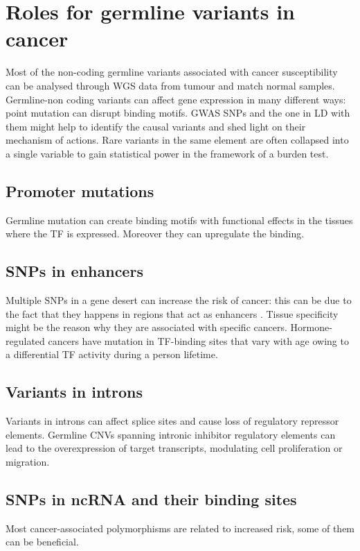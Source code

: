 \section{Roles for germline variants in cancer}
Most of the non-coding germline variants associated with cancer susceptibility can be analysed through WGS data from tumour and match normal samples.
Germline-non coding variants can affect gene expression in many different ways: point mutation can disrupt binding motifs.
GWAS SNPs and the one in LD with them might help to identify the causal variants and shed light on their mechanism of actions.
Rare variants in the same element are often collapsed into a single variable to gain statistical power in the framework of a burden test.

	\subsection{Promoter mutations}
	Germline mutation can create binding motifs with functional effects in the tissues where the TF is expressed.
	Moreover they can upregulate the binding.

	\subsection{SNPs in enhancers}
	Multiple SNPs in a gene desert can increase the risk of cancer: this can be due to the fact that they happens in regions that act as enhancers .
	Tissue specificity might be the reason why they are associated with specific cancers.
	Hormone-regulated cancers have mutation in TF-binding sites that vary with age owing to a differential TF activity during a person lifetime.

	\subsection{Variants in introns}
	Variants in introns can affect splice sites and cause loss of regulatory repressor elements.
	Germline CNVs spanning intronic inhibitor regulatory elements can lead to the overexpression of target transcripts, modulating cell proliferation or migration.

	\subsection{SNPs in ncRNA and their binding sites}
	Most cancer-associated polymorphisms are related to increased risk, some of them can be beneficial.

